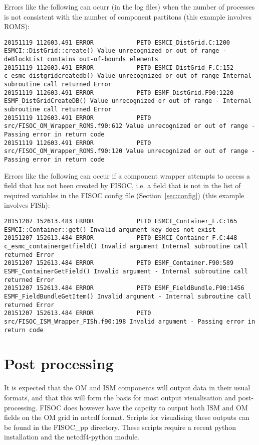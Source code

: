 \documentclass[12pt]{article}
\begin{document}
Errors like the following can ocurr (in the log files) when the number of processes is 
not consistent with the number of component partitons (this example involves ROMS):
\begin{lstlisting}
20151119 112603.491 ERROR            PET0 ESMCI_DistGrid.C:1200 ESMCI::DistGrid::create() Value unrecognized or out of range - deBlockList contains out-of-bounds elements
20151119 112603.491 ERROR            PET0 ESMCI_DistGrid_F.C:152 c_esmc_distgridcreatedb() Value unrecognized or out of range Internal subroutine call returned Error
20151119 112603.491 ERROR            PET0 ESMF_DistGrid.F90:1220 ESMF_DistGridCreateDB() Value unrecognized or out of range - Internal subroutine call returned Error
20151119 112603.491 ERROR            PET0 src/FISOC_OM_Wrapper_ROMS.f90:612 Value unrecognized or out of range - Passing error in return code
20151119 112603.491 ERROR            PET0 src/FISOC_OM_Wrapper_ROMS.f90:120 Value unrecognized or out of range - Passing error in return code
\end{lstlisting}

Errors like the following can occur if a component wrapper attempts to access a field 
that has not been created by FISOC, i.e. a field that is not in the list of
required variables in the FISOC config file (Section~\ref{sec:config}) 
(this example involves FISh):
\begin{lstlisting}
20151207 152613.483 ERROR            PET0 ESMCI_Container_F.C:165 ESMCI::Container::get() Invalid argument key does not exist
20151207 152613.484 ERROR            PET0 ESMCI_Container_F.C:448 c_esmc_containergetfield() Invalid argument Internal subroutine call returned Error
20151207 152613.484 ERROR            PET0 ESMF_Container.F90:589 ESMF_ContainerGetField() Invalid argument - Internal subroutine call returned Error
20151207 152613.484 ERROR            PET0 ESMF_FieldBundle.F90:1456 ESMF_FieldBundleGetItem() Invalid argument - Internal subroutine call returned Error
20151207 152613.484 ERROR            PET0 src/FISOC_ISM_Wrapper_FISh.f90:198 Invalid argument - Passing error in return code
\end{lstlisting}



\section{Post processing}

It is expected that the OM and ISM components will output data in their usual formats, 
and that this will form the basis for most output visualisation and post-processing.
FISOC does however have the capcity to output both ISM and OM fields on the OM grid 
in netcdf format.
Scripts for visualising these outputs can be found in the FISOC\_pp directory.
These scripts require a recent python installation and the netcdf4-python module.
\end{document}
